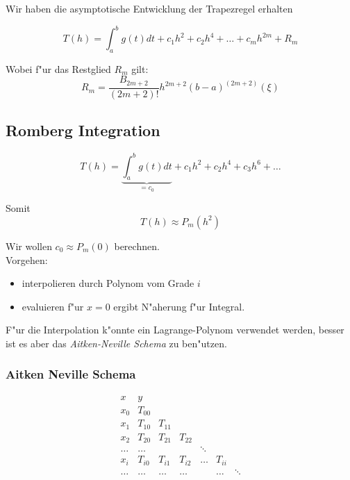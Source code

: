 \documentclass[german, 10pt, a4paper, twocolumn]{scrartcl}
\theoremstyle{definition}
\begin{document}
Wir haben die asymptotische Entwicklung der Trapezregel erhalten

\begin{displaymath}
	T(h) = \int^b_a g(t) dt + c_1 h^2 + c_2 h^4 + \ldots + c_m h^{2m} + R_m
\end{displaymath}

Wobei f"ur das Restglied $R_m$ gilt:
\begin{displaymath}
	R_m = \frac{B_{2m+2}}{(2m+2)!} h^{2m+2}(b-a)^{(2m+2)}(\xi)
\end{displaymath}

\subsection{Romberg Integration}

\begin{displaymath}
	T(h) = \underbrace{\int^b_a g(t)dt}_{= c_0} + c_1 h^2 + c_2 h^4 + c_3 h^6 + \ldots
\end{displaymath}

Somit
\begin{displaymath}
	T(h) \approx P_m(h^2)
\end{displaymath}

Wir wollen $c_0 \approx P_m(0)$ berechnen.\\

Vorgehen:
\begin{itemize}
	\item interpolieren durch Polynom vom Grade $i$
	\item evaluieren f"ur $x=0$ ergibt N"aherung f"ur Integral.
\end{itemize}

F"ur die Interpolation k"onnte ein Lagrange-Polynom verwendet werden, besser ist es aber das \textit{Aitken-Neville Schema} zu ben"utzen.

\subsubsection{Aitken Neville Schema}

\begin{displaymath}
\begin{array}{c|cccccc}
	x &		y \\ \hline
	x_0 &		T_{00}\\
	x_1 &		T_{10} &	T_{11}\\
	x_2 &		T_{20} &	T_{21} &	T_{22}\\
	\hdots &	\hdots &	&		&		\ddots\\
	x_i &		T_{i0} &	T_{i1} &	T_{i2} &	\hdots &	T_{ii}\\
	\hdots &	\hdots &	\hdots &	\hdots &	&		\hdots &	\ddots
\end{array}
\end{displaymath}
\end{document}
